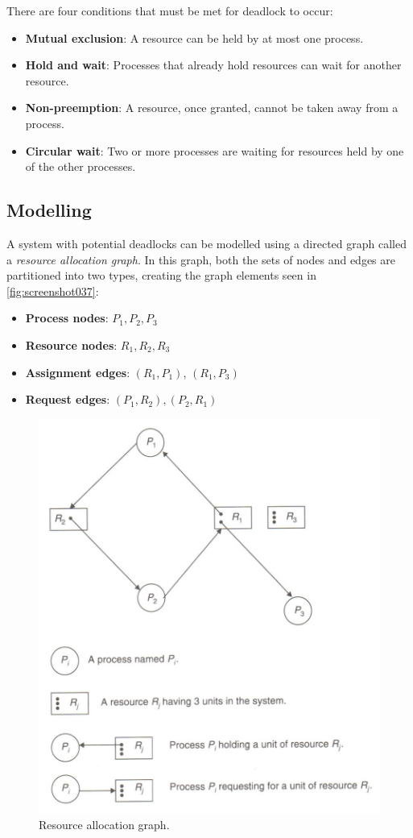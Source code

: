 There are four conditions that must be met for deadlock to occur:
\begin{itemize}
\item \textbf{Mutual exclusion}: A resource can be held by at most one process.
\item \textbf{Hold and wait}: Processes that already hold resources can wait for another resource. 
\item \textbf{Non-preemption}: A resource, once granted, cannot be taken away from a process. 
\item \textbf{Circular wait}: Two or more processes are waiting for resources held by one of the other processes. 
\end{itemize}

\subsection{Modelling}
A system with potential deadlocks can be modelled using a directed graph called a \textit{resource allocation graph}. In this graph, both the sets of nodes and edges are partitioned into two types, creating the graph elements seen in \autoref{fig:screenshot037}:
\begin{itemize}
\item \textbf{Process nodes}: $P_1, P_2, P_3$
\item \textbf{Resource nodes}: $R_1, R_2, R_3$
\item \textbf{Assignment edges}: $(R_1, P_1)$, $(R_1, P_3)$
\item \textbf{Request edges}: $(P_1, R_2), (P_2, R_1)$
\end{itemize}

\begin{figure}
\centering
\includegraphics[width=0.6\linewidth]{figures/screenshot037}
\caption{Resource allocation graph.}
\label{fig:screenshot037}
\end{figure}


